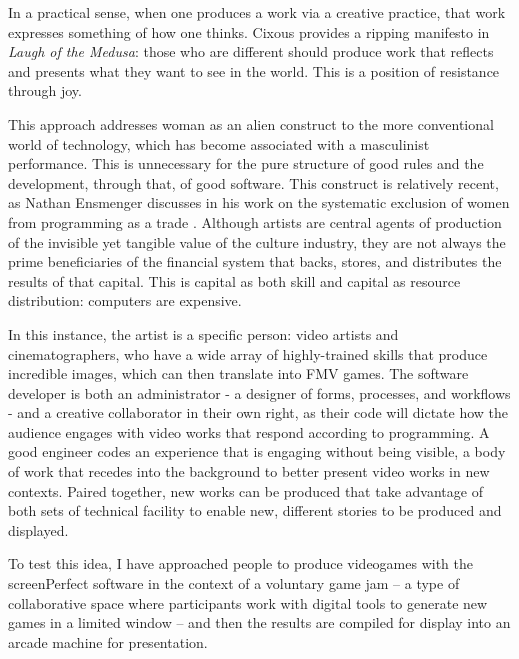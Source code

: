 In a practical sense, when one produces a work via a creative practice, that work expresses something of how one thinks. Cixous provides a ripping manifesto in \textit{Laugh of the Medusa}: those who are different should produce work that reflects and presents what they want to see in the world. This is a position of resistance through joy. 

This approach addresses woman as an alien construct to the more conventional world of technology, which has become associated with a masculinist performance. This is unnecessary for the pure structure of good rules and the development, through that, of good software. This construct is relatively recent, as Nathan Ensmenger discusses in his work on the systematic exclusion of women from programming as a trade \parencite{ensmenger}.
Although artists are central agents of production of the invisible yet tangible value of the culture industry, they are not always the prime beneficiaries of the financial system that backs, stores, and distributes the results of that capital. This is capital as both skill and capital as resource distribution: computers are expensive. 

In this instance, the artist is a specific person: video artists and cinematographers, who have a wide array of highly-trained skills that produce incredible images, which can then translate into FMV games. The software developer is both an administrator - a designer of forms, processes, and workflows - and a creative collaborator in their own right, as their code will dictate how the audience engages with video works that respond according to programming. A good engineer codes an experience that is engaging without being visible, a body of work that recedes into the background to better present video works in new contexts. Paired together, new works can be produced that take advantage of both sets of technical facility to enable new, different stories to be produced and displayed.

To test this idea, I have approached people to produce videogames with the screenPerfect software in the context of a voluntary game jam – a type of collaborative space where participants work with digital tools to generate new games in a limited window – and then the results are compiled for display into an arcade machine for presentation.

